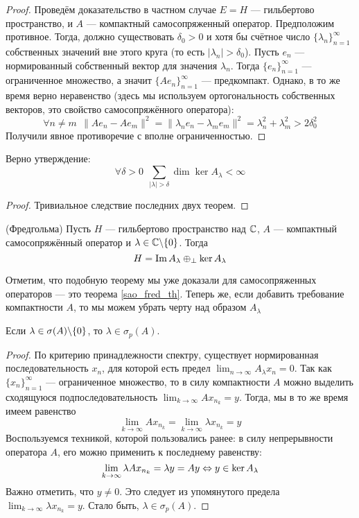 \begin{proof}
	Проведём доказательство в частном случае $E = H$ --- гильбертово пространство, и $A$ --- компактный самосопряженный оператор. Предположим противное. Тогда, должно существовать $\delta_0 > 0$ и хотя бы счётное число $\{\lambda_n\}_{n = 1}^\infty$ собственных значений вне этого круга (то есть $|\lambda_n| > \delta_0$). Пусть $e_n$ --- нормированный собственный вектор для значения $\lambda_n$. Тогда $\{e_n\}_{n = 1}^\infty$ --- ограниченное множество, а значит $\{Ae_n\}_{n = 1}^\infty$ --- предкомпакт. Однако, в то же время верно неравенство (здесь мы используем ортогональность собственных векторов, это свойство самосопряжённого оператора):
	\[
		\forall n \neq m\ \ \|Ae_n - Ae_m\|^2 = \|\lambda_n e_n - \lambda_m e_m\|^2 = \lambda_n^2 + \lambda_m^2 > 2\delta_0^2
	\]
	Получили явное противоречие с вполне ограниченностью.
\end{proof}

\begin{corollary}
	Верно утверждение:
	\[
		\forall \delta > 0\ \ \sum_{|\lambda| > \delta} \dim \ker A_\lambda < \infty
	\]
\end{corollary}

\begin{proof}
	Тривиальное следствие последних двух теорем.
\end{proof}

\begin{theorem} (Фредгольма)
	Пусть $H$ --- гильбертово пространство над $\mathbb{C}$, $A$ --- компактный самосопряжённый оператор и $\lambda \in \mathbb{C} \backslash \{0\}$. Тогда
	\[
		H = \operatorname{Im} A_\lambda \oplus_{\bot} \ker A_\lambda
	\]
\end{theorem}

\begin{note}
	Отметим, что подобную теорему мы уже доказали для самосопряженных операторов --- это теорема \ref{sao_fred_th}. Теперь же, если добавить требование компактности $A$, то мы можем убрать черту над образом $A_\lambda$
\end{note}

\begin{lemma} \label{simple_spectre}
	Если $\lambda \in \sigma(A) \backslash \{0\}$, то $\lambda \in \sigma_p(A)$.
\end{lemma}

\begin{proof}
	По критерию принадлежности спектру, существует нормированная последовательность $x_n$, для которой есть предел $\lim_{n \to \infty} A_\lambda x_n = 0$. Так как $\{x_n\}_{n = 1}^\infty$ --- ограниченное множество, то в силу компактности $A$ можно выделить сходящуюся подпоследовательность $\lim_{k \to \infty} Ax_{n_k} = y$. Тогда, мы в то же время имеем равенство
	\[
		\lim_{k \to \infty} Ax_{n_k} = \lim_{k \to \infty} \lambda x_{n_k} = y
	\]
	Воспользуемся техникой, которой пользовались ранее: в силу непрерывности оператора $A$, его можно применить к последнему равенству:
	\[
		\lim_{k \to \infty} \lambda Ax_{n_k} = \lambda y = Ay \Leftrightarrow y \in \ker A_\lambda
	\]
	Важно отметить, что $y \neq 0$. Это следует из упомянутого предела $\lim_{k \to \infty} \lambda x_{n_k} = y$. Стало быть, $\lambda \in \sigma_p(A)$.
\end{proof}

